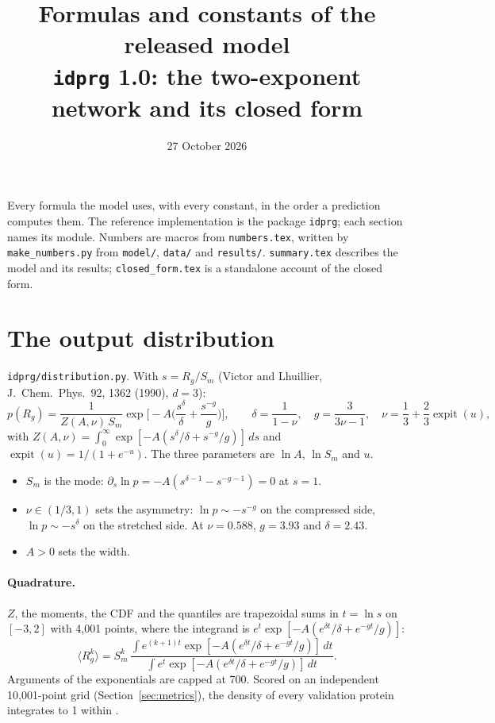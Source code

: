 \documentclass[11pt]{article}
\title{Formulas and constants of the released model\\ \large \texttt{idprg} 1.0: the two-exponent network and its closed form}
\date{27 October 2026}
\author{}
\newcommand{\Rg}{R_g}
\newcommand{\expit}{\operatorname{expit}}
\begin{document}
\maketitle

\noindent Every formula the model uses, with every constant, in the order a prediction computes them. The reference
implementation is the package \texttt{idprg}; each section names its module. Numbers are macros from
\texttt{numbers.tex}, written by \texttt{make\_numbers.py} from \texttt{model/}, \texttt{data/} and \texttt{results/}.
\texttt{summary.tex} describes the model and its results; \texttt{closed\_form.tex} is a standalone account of the closed
form.

\tableofcontents

\section{The output distribution}\label{sec:dist}
\texttt{idprg/distribution.py}. With $s=\Rg/S_m$ (Victor and Lhuillier, J.\ Chem.\ Phys.\ 92, 1362 (1990), $d=3$):
\begin{equation}\label{eq:p}
p(\Rg)=\frac{1}{Z(A,\nu)\,S_m}\exp\!\Big[-A\Big(\frac{s^{\delta}}{\delta}+\frac{s^{-g}}{g}\Big)\Big],\qquad
\delta=\frac{1}{1-\nu},\quad g=\frac{3}{3\nu-1},\quad \nu=\frac13+\frac23\expit(u),
\end{equation}
with $Z(A,\nu)=\int_0^\infty\exp[-A(s^\delta/\delta+s^{-g}/g)]\,ds$ and $\expit(u)=1/(1+e^{-u})$. The three parameters
are $\ln A$, $\ln S_m$ and $u$.
\begin{itemize}
\item $S_m$ is the mode: $\partial_s\ln p=-A(s^{\delta-1}-s^{-g-1})=0$ at $s=1$.
\item $\nu\in(1/3,1)$ sets the asymmetry: $\ln p\sim-s^{-g}$ on the compressed side, $\ln p\sim-s^{\delta}$ on the
  stretched side. At $\nu=0.588$, $g=3.93$ and $\delta=2.43$.
\item $A>0$ sets the width.
\end{itemize}

\paragraph{Quadrature.} $Z$, the moments, the CDF and the quantiles are trapezoidal sums in $t=\ln s$ on $[-3,2]$ with
4{,}001 points, where the integrand is $e^{t}\exp[-A(e^{\delta t}/\delta+e^{-gt}/g)]$:
\begin{equation}
\langle\Rg^k\rangle=S_m^k\,\frac{\int e^{(k+1)t}\exp[-A(e^{\delta t}/\delta+e^{-gt}/g)]\,dt}
{\int e^{t}\exp[-A(e^{\delta t}/\delta+e^{-gt}/g)]\,dt}.
\end{equation}
Arguments of the exponentials are capped at 700. Scored on an independent 10{,}001-point grid
(Section~\ref{sec:metrics}), the density of every validation protein integrates to 1 within
.
\end{document}
